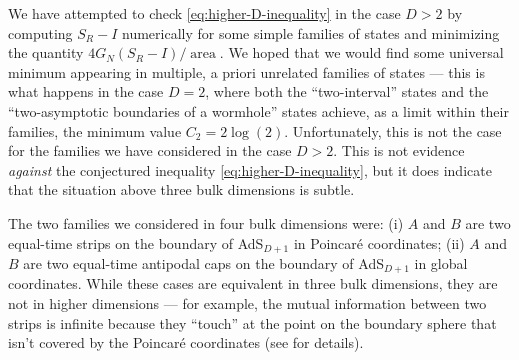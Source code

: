 \documentclass[a4paper,11pt]{article}
\newcommand{\area}{\operatorname{area}}
\begin{document}
We have attempted to check \eqref{eq:higher-D-inequality} in the case $D>2$ by computing $S_R - I$ numerically for some simple families of states and minimizing the quantity $4 G_N (S_R - I) / \area.$ We hoped that we would find some universal minimum appearing in multiple, a priori unrelated families of states --- this is what happens in the case $D=2$, where both the ``two-interval'' states and the ``two-asymptotic boundaries of a wormhole'' states achieve, as a limit within their families, the minimum value $C_2 = 2 \log(2).$ Unfortunately, this is not the case for the families we have considered in the case $D>2$. This is not evidence \emph{against} the conjectured inequality \eqref{eq:higher-D-inequality}, but it does indicate that the situation above three bulk dimensions is subtle.

The two families we considered in four bulk dimensions were: (i) $A$ and $B$ are two equal-time strips on the boundary of AdS$_{D+1}$ in Poincar\'{e} coordinates; (ii) $A$ and $B$ are two equal-time antipodal caps on the boundary of AdS$_{D+1}$ in global coordinates. While these cases are equivalent in three bulk dimensions, they are not in higher dimensions --- for example, the mutual information between two strips is infinite because they ``touch'' at the point on the boundary sphere that isn't covered by the Poincar\'{e} coordinates (see \cite{fischler2013holographic} for details).
\end{document}
